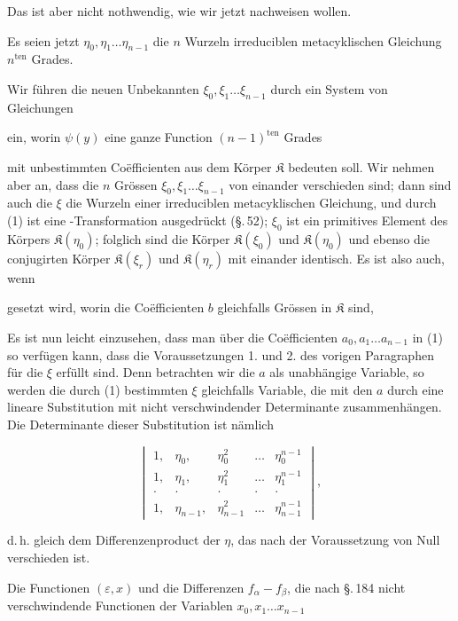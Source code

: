 
Das ist aber nicht nothwendig, wie wir jetzt nachweisen wollen.

Es seien jetzt $\eta_0, \eta_1 \ldots \eta_{n-1}$ die $n$ Wurzeln  irreduciblen metacyklischen Gleichung $n^{\mathrm{ten}}$ Grades.

Wir führen die neuen Unbekannten $\xi_0, \xi_1 \ldots \xi_{n-1}$ durch ein System von Gleichungen


ein, worin $\psi(y)$ eine ganze Function $(n-1)^{\mathrm{ten}}$ Grades


mit unbestimmten Co\"efficienten aus dem Körper $\mathfrak{K}$ bedeuten soll. Wir nehmen aber an, dass die $n$ Grössen $\xi_0, \xi_1 \ldots \xi_{n-1}$ von einander verschieden sind; dann sind auch die $\xi$ die Wurzeln einer irreduciblen metacyklischen Gleichung, und durch (1) ist eine -Transformation ausgedrückt (\S.\,52); $\xi_0$ ist ein primitives Element des Körpers $\mathfrak{K}(\eta_0)$; folglich sind die Körper $\mathfrak{K}(\xi_0)$ und $\mathfrak{K}(\eta_0)$ und ebenso die conjugirten Körper $\mathfrak{K}(\xi_r)$ und $\mathfrak{K}(\eta_r)$ mit einander identisch. Es ist also auch, wenn


gesetzt wird, worin die Coëfficienten $b$ gleichfalls Grössen in $\mathfrak{K}$ sind,


Es ist nun leicht einzusehen, dass man über die Coëfficienten $a_0, a_1 \ldots a_{n-1}$ in (1) so verfügen kann, dass die Voraussetzungen 1. und 2. des vorigen Paragraphen für die $\xi$ erfüllt sind. Denn betrachten wir die $a$ als unabhängige Variable, so werden die durch (1) bestimmten $\xi$ gleichfalls Variable, die mit den $a$ durch eine lineare Substitution mit nicht verschwindender Determinante zusammenhängen. Die Determinante dieser Substitution ist nämlich

\[
\begin{vmatrix}
1, & \eta_0, & \eta_0^2 & \ldots & \eta_0^{n-1} \\
1, & \eta_1, & \eta_1^2 & \ldots & \eta_1^{n-1} \\
\cdot & \cdot & \cdot & \cdot & \cdot \\
1, & \eta_{n-1}, & \eta_{n-1}^2 & \ldots & \eta_{n-1}^{n-1}
\end{vmatrix},
\]

d.\,h. gleich dem Differenzenproduct der $\eta$, das nach der Voraussetzung von Null verschieden ist.

Die Functionen $(\varepsilon, x)$ und die Differenzen $f_\alpha - f_\beta$, die nach \S.\,184 nicht verschwindende Functionen der Variablen $x_0, x_1 \ldots x_{n-1}$
